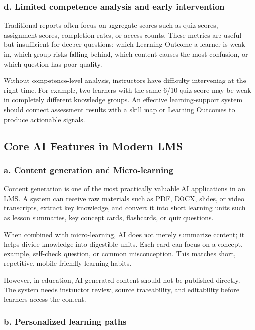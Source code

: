 \subsubsection*{d. Limited competence analysis and early intervention}

Traditional reports often focus on aggregate scores such as quiz scores,
assignment scores, completion rates, or access counts. These metrics are useful
but insufficient for deeper questions: which Learning Outcome a learner is weak
in, which group risks falling behind, which content causes the most confusion,
or which question has poor quality.

Without competence-level analysis, instructors have difficulty intervening at
the right time. For example, two learners with the same 6/10 quiz score may be
weak in completely different knowledge groups. An effective learning-support
system should connect assessment results with a skill map or Learning Outcomes
to produce actionable signals.

\subsection{Core AI Features in Modern LMS}

\subsubsection*{a. Content generation and Micro-learning}

Content generation is one of the most practically valuable AI applications in
an LMS. A system can receive raw materials such as PDF, DOCX, slides, or video
transcripts, extract key knowledge, and convert it into short learning units
such as lesson summaries, key concept cards, flashcards, or quiz questions.

When combined with micro-learning, AI does not merely summarize content; it
helps divide knowledge into digestible units. Each card can focus on a concept,
example, self-check question, or common misconception. This matches short,
repetitive, mobile-friendly learning habits.

However, in education, AI-generated content should not be published directly.
The system needs instructor review, source traceability, and editability before
learners access the content.

\subsubsection*{b. Personalized learning paths}

